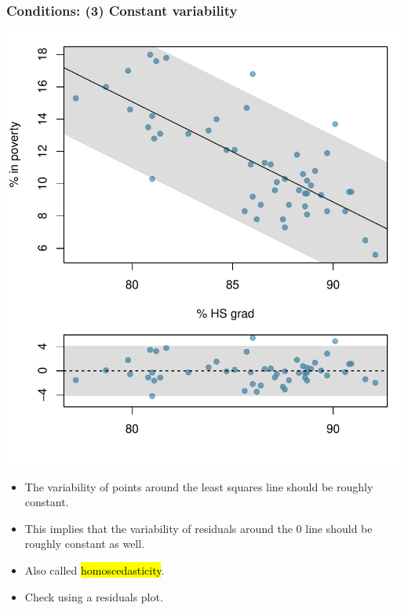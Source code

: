 \begin{frame}
\frametitle{Conditions: (3) Constant variability}

{
\begin{center}
\includegraphics[width=\textwidth]{8-2_least_square_reg/figures/poverty/poverty_hsgrad_tube}
\end{center}
}
{
\begin{itemize}

\item The variability of points around the least squares line should be roughly constant.

\pause

\item This implies that the variability of residuals around the 0 line should be roughly constant as well.

\pause

\item Also called \hl{homoscedasticity}.

\pause

\item Check using a residuals plot.

\end{itemize}
}


\end{frame}

